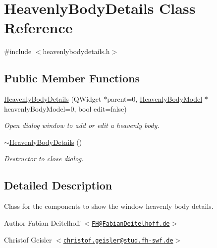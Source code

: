 \hypertarget{classHeavenlyBodyDetails}{
\section{\-Heavenly\-Body\-Details \-Class \-Reference}
\label{dd/d37/classHeavenlyBodyDetails}
}


{\ttfamily \#include $<$heavenlybodydetails.\-h$>$}

\subsection*{\-Public \-Member \-Functions}
\begin{DoxyCompactItemize}
\item 
\hyperlink{classHeavenlyBodyDetails_a054ec45af11e8f42cba7f0b40eb5f8e8}{\-Heavenly\-Body\-Details} (\-Q\-Widget $\ast$parent=0, \hyperlink{classHeavenlyBodyModel}{\-Heavenly\-Body\-Model} $\ast$heavenly\-Body\-Model=0, bool edit=false)
\begin{DoxyCompactList}\small\item\em \-Open dialog window to add or edit a heavenly body. \end{DoxyCompactList}\item 
\hyperlink{classHeavenlyBodyDetails_a7f2566a1ba36b51157a6d0c753a0c545}{$\sim$\-Heavenly\-Body\-Details} ()
\begin{DoxyCompactList}\small\item\em \-Destructor to close dialog. \end{DoxyCompactList}\end{DoxyCompactItemize}


\subsection{\-Detailed \-Description}
\-Class for the components to show the window heavenly body details.

\begin{DoxyAuthor}{\-Author}
\-Fabian \-Deitelhoff $<$\href{mailto:FH@FabianDeitelhoff.de}{\tt \-F\-H@\-Fabian\-Deitelhoff.\-de}$>$ 

\-Christof \-Geisler $<$\href{mailto:christof.geisler@stud.fh-swf.de}{\tt christof.\-geisler@stud.\-fh-\/swf.\-de}$>$ 
\end{DoxyAuthor}


